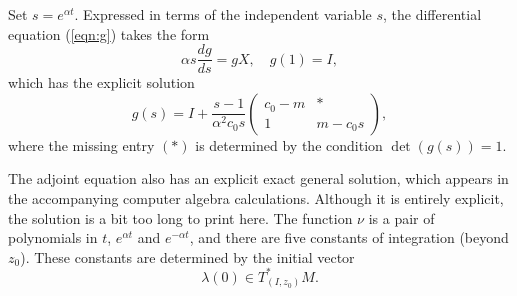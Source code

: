 \documentclass{article}
\theoremstyle{remark}
\begin{document}
Set $s= e^{\alpha t}$.  Expressed in terms of the independent variable $s$, 
the differential equation (\ref{eqn:g}) takes the form
\[
\alpha s\frac{dg}{ds} = g X,\quad g(1)=I,
\]
which has the explicit solution
\[
g(s) = I + \frac{s-1}{\alpha^2 c_0 s}\begin{pmatrix}
c_0-m & * \\
1 & 
 m-c_0 s
\end{pmatrix},
\]
where the missing entry $(*)$ is determined by the condition
$\det(g(s))=1$.

The adjoint equation also has an explicit exact general solution,
which appears in the accompanying computer algebra calculations.
Although it is entirely explicit, the solution is a bit too long to
print here.  The function $\nu$ is a pair of polynomials in $t$,
$e^{\alpha t}$ and $e^{-\alpha t}$, and there are five constants of
integration (beyond $z_0$).  These constants are determined by the
initial vector
\[
\lambda(0)\in T_{(I,z_0)}^* M.
\]
\end{document}
